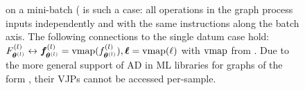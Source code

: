 \begin{figure*}[!t]
{    on a mini-batch ( is such a case: all
    operations in the graph process inputs independently and with the same
    instructions along the batch axis. The following connections to the single
    datum case  hold:
    $F_{{\bm{\theta}}^{(l)}}^{(l)} \leftrightarrow {\bm{f}}_{{\bm{\theta}}^{(l)}}^{(l)} =
    \operatorname{vmap}(f_{{\bm{\theta}}^{(l)}}^{(l)}), {\bm{\ell}} = \operatorname{vmap}(\ell)$ with $\operatorname{vmap}$ from
    . Due to the more general support of AD in ML
    libraries for graphs of the form
    , their VJPs cannot
    be accessed per-sample.}\label{fig:background::gradientBackpropagation}
\end{figure*}

